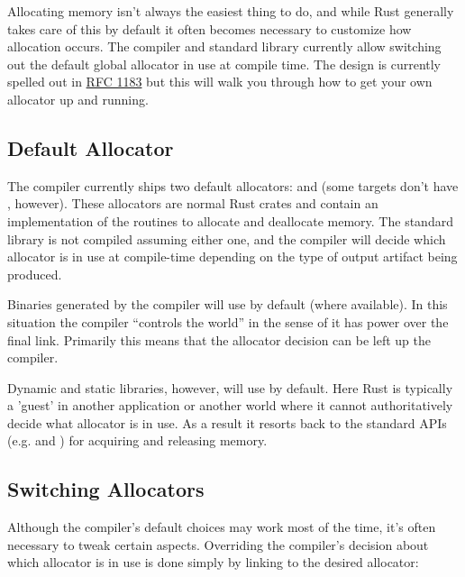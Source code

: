 Allocating memory isn't always the easiest thing to do, and while Rust generally takes care of this by default it often 
becomes necessary to customize how allocation occurs. The compiler and standard library currently allow switching out the 
default global allocator in use at compile time. The design is currently spelled out in 
\href{https://github.com/rust-lang/rfcs/blob/master/text/1183-swap-out-jemalloc.md}{RFC 1183} but this will walk you through 
how to get your own allocator up and running.

\subsection*{Default Allocator}

The compiler currently ships two default allocators:  and  (some targets don't have 
, however). These allocators are normal Rust crates and contain an implementation of the routines to allocate 
and deallocate memory. The standard library is not compiled assuming either one, and the compiler will decide which allocator 
is in use at compile-time depending on the type of output artifact being produced.

\blank

Binaries generated by the compiler will use  by default (where available). In this situation the 
compiler \enquote{controls the world} in the sense of it has power over the final link. Primarily this means that the 
allocator decision can be left up the compiler.

\blank

Dynamic and static libraries, however, will use  by default. Here Rust is typically a 'guest' in another 
application or another world where it cannot authoritatively decide what allocator is in use. As a result it resorts back to 
the standard APIs (e.g.  and ) for acquiring and releasing memory.

\subsection*{Switching Allocators}

Although the compiler's default choices may work most of the time, it's often necessary to tweak certain aspects. Overriding 
the compiler's decision about which allocator is in use is done simply by linking to the desired allocator:


